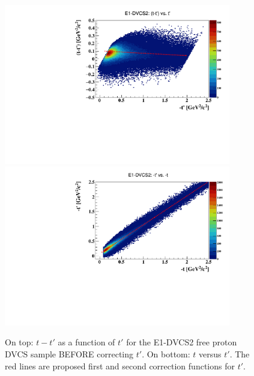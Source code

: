 \documentclass[a4paper,11pt,twoside]{article}
\begin{document}
\begin{figure}[h!]
\centering
\includegraphics[height=7.0cm]{fig/h_tprimet_t_InCoh_2.pdf}
\includegraphics[height=7.0cm]{fig/h_tprimet_t_InCoh_3.pdf}
\caption{On top: $t-t'$ as a function of $t'$ for the E1-DVCS2 free proton DVCS 
sample BEFORE correcting $t'$. On bottom: $t$ versus $t'$. The red lines are 
proposed first and second correction functions for $t'$.}
\label{fig:corrections_tprime_e1dvcs2}
\end{figure}

\end{document}
